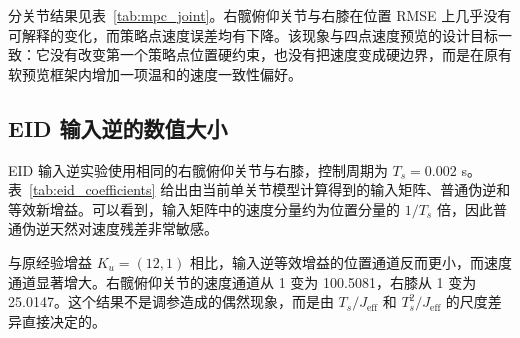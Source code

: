 \documentclass[12pt,a4paper]{ctexart}
\begin{document}
分关节结果见表~\ref{tab:mpc_joint}。右髋俯仰关节与右膝在位置 RMSE 上几乎没有可解释的变化，而策略点速度误差均有下降。该现象与四点速度预览的设计目标一致：它没有改变第一个策略点位置硬约束，也没有把速度变成硬边界，而是在原有软预览框架内增加一项温和的速度一致性偏好。

\subsection{EID 输入逆的数值大小}

EID 输入逆实验使用相同的右髋俯仰关节与右膝，控制周期为 \(T_s=0.002\) s。表~\ref{tab:eid_coefficients} 给出由当前单关节模型计算得到的输入矩阵、普通伪逆和等效新增益。可以看到，输入矩阵中的速度分量约为位置分量的 \(1/T_s\) 倍，因此普通伪逆天然对速度残差非常敏感。

\begin{table}[htbp]
\centering
\caption{EID 输入矩阵、普通伪逆和输入逆等效增益}
\label{tab:eid_coefficients}
\end{table}

与原经验增益 \(K_u=(12,1)\) 相比，输入逆等效增益的位置通道反而更小，而速度通道显著增大。右髋俯仰关节的速度通道从 1 变为 100.5081，右膝从 1 变为 25.0147。这个结果不是调参造成的偶然现象，而是由 \(T_s/J_\mathrm{eff}\) 和 \(T_s^2/J_\mathrm{eff}\) 的尺度差异直接决定的。
\end{document}
